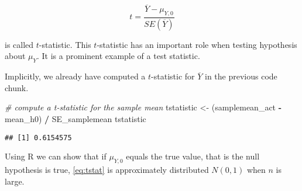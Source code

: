 \documentclass[]{book}
\newenvironment{Shaded}{\begin{snugshade}}{\end{snugshade}}
\newcommand{\StringTok}[1]{\textcolor[rgb]{0.31,0.60,0.02}{#1}}
\newcommand{\CommentTok}[1]{\textcolor[rgb]{0.56,0.35,0.01}{\textit{#1}}}
\newcommand{\OperatorTok}[1]{\textcolor[rgb]{0.81,0.36,0.00}{\textbf{#1}}}
\newcommand{\NormalTok}[1]{#1}
\theoremstyle{definition}
\theoremstyle{definition}
\theoremstyle{definition}
\theoremstyle{remark}
\begin{document}
\begin{equation}
t = \frac{\overline{Y} - \mu_{Y,0}}{SE(\overline{Y})} \label{eq:tstat}
\end{equation}

is called \(t\)-statistic. This \(t\)-statistic has an important role
when testing hypothesis about \(\mu_Y\). It is a prominent example of a
test statistic.

Implicitly, we already have computed a \(t\)-statistic for
\(\overline{Y}\) in the previous code chunk.

\begin{Shaded}
\begin{Highlighting}[]
\CommentTok{# compute a t-statistic for the sample mean}
\NormalTok{tstatistic <-}\StringTok{ }\NormalTok{(samplemean_act }\OperatorTok{-}\StringTok{ }\NormalTok{mean_h0) }\OperatorTok{/}\StringTok{ }\NormalTok{SE_samplemean}
\NormalTok{tstatistic}
\end{Highlighting}
\end{Shaded}

\begin{verbatim}
## [1] 0.6154575
\end{verbatim}

Using R we can show that if \(\mu_{Y,0}\) equals the true value, that is
the null hypothesis is true, \eqref{eq:tstat} is approximately distributed
\(N(0,1)\) when \(n\) is large.
\end{document}
